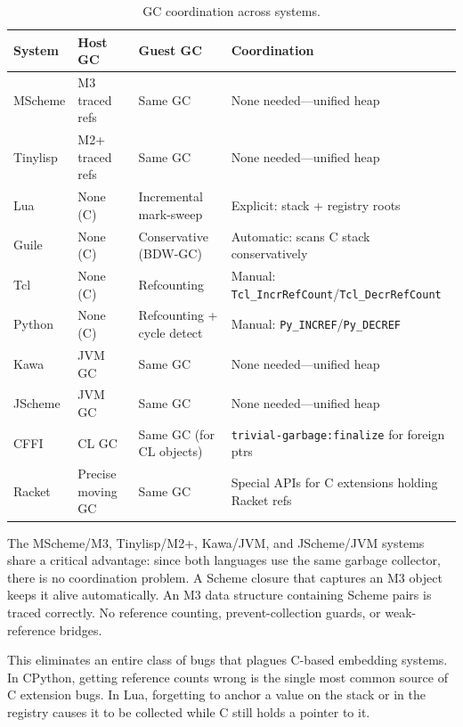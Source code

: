 \documentclass[11pt]{article}
\begin{document}
\begin{table}[ht]
\centering
\small
\begin{tabular}{@{}llll@{}}
\toprule
System   & Host GC            & Guest GC                   & Coordination \\
\midrule
MScheme  & M3 traced refs     & Same GC                    & None needed---unified heap \\
Tinylisp & M2+ traced refs    & Same GC                    & None needed---unified heap \\
Lua      & None (C)           & Incremental mark-sweep     & Explicit: stack + registry roots \\
Guile    & None (C)           & Conservative (BDW-GC)      & Automatic: scans C stack conservatively \\
Tcl      & None (C)           & Refcounting                & Manual: \texttt{Tcl\_IncrRefCount}/\texttt{Tcl\_DecrRefCount} \\
Python   & None (C)           & Refcounting + cycle detect & Manual: \texttt{Py\_INCREF}/\texttt{Py\_DECREF} \\
Kawa     & JVM GC             & Same GC                    & None needed---unified heap \\
JScheme  & JVM GC             & Same GC                    & None needed---unified heap \\
CFFI     & CL GC              & Same GC (for CL objects)   & \texttt{trivial-garbage:finalize} for foreign ptrs \\
Racket   & Precise moving GC  & Same GC                    & Special APIs for C extensions holding Racket refs \\
\bottomrule
\end{tabular}
\caption{GC coordination across systems.}
\label{tab:gc-coordination}
\end{table}

The MScheme/M3, Tinylisp/M2+, Kawa/JVM, and JScheme/JVM systems
share a critical advantage: since both languages use the same garbage
collector, there is no coordination problem.  A Scheme closure that
captures an M3 object keeps it alive automatically.  An M3 data
structure containing Scheme pairs is traced correctly.  No reference
counting, prevent-collection guards, or weak-reference bridges.

This eliminates an entire class of bugs that plagues C-based embedding
systems.  In CPython, getting reference counts wrong is the single
most common source of C extension bugs.  In Lua, forgetting to anchor
a value on the stack or in the registry causes it to be collected while
C still holds a pointer to it.
\end{document}
